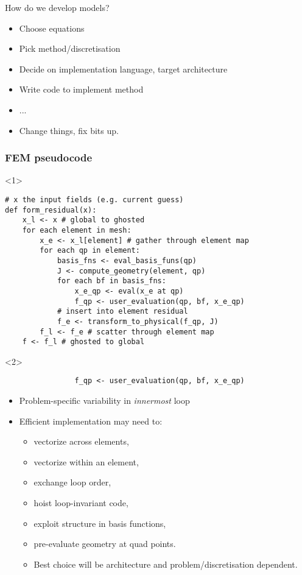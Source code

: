 \documentclass[presentation]{beamer}
\begin{document}
\begin{frame}
  How do we develop models?

  \begin{itemize}
  \item Choose equations
  \item Pick method/discretisation
  \item Decide on implementation language, target architecture
  \item Write code to implement method
  \item ...
  \item Change things, fix bits up.
  \end{itemize}
\end{frame}

\begin{frame}[fragile]
  \frametitle{FEM pseudocode}

  \begin{onlyenv}<1>
\begin{verbatim}
# x the input fields (e.g. current guess)
def form_residual(x):
    x_l <- x # global to ghosted
    for each element in mesh:
        x_e <- x_l[element] # gather through element map
        for each qp in element:
            basis_fns <- eval_basis_funs(qp)
            J <- compute_geometry(element, qp)
            for each bf in basis_fns:
                x_e_qp <- eval(x_e at qp)
                f_qp <- user_evaluation(qp, bf, x_e_qp)
            # insert into element residual
            f_e <- transform_to_physical(f_qp, J)
        f_l <- f_e # scatter through element map
    f <- f_l # ghosted to global
\end{verbatim}
  \end{onlyenv}

  \begin{onlyenv}<2>
\begin{verbatim}
                f_qp <- user_evaluation(qp, bf, x_e_qp)
\end{verbatim}
    \begin{itemize}
    \item Problem-specific variability in \emph{innermost} loop
    \item Efficient implementation may need to:
      \begin{itemize}
      \item vectorize across elements,
      \item vectorize within an element,
      \item exchange loop order,
      \item hoist loop-invariant code,
      \item exploit structure in basis functions,
      \item pre-evaluate geometry at quad points.
      \item Best choice will be architecture and
        problem/discretisation dependent.
      \end{itemize}
    \end{itemize}
  \end{onlyenv}
\end{frame}
\end{document}
